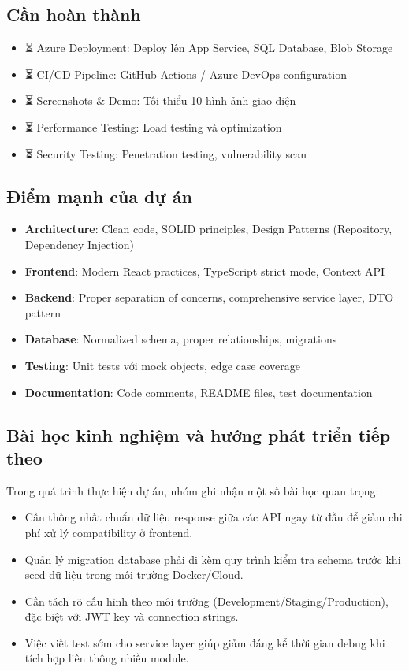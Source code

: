 \documentclass[a4paper]{article}
\begin{document}
    \subsection{Cần hoàn thành}
    \begin{itemize}
        \item ⏳ Azure Deployment: Deploy lên App Service, SQL Database, Blob Storage
        \item ⏳ CI/CD Pipeline: GitHub Actions / Azure DevOps configuration
        \item ⏳ Screenshots & Demo: Tối thiểu 10 hình ảnh giao diện
        \item ⏳ Performance Testing: Load testing và optimization
        \item ⏳ Security Testing: Penetration testing, vulnerability scan
    \end{itemize}

    \subsection{Điểm mạnh của dự án}
    \begin{itemize}
        \item \textbf{Architecture}: Clean code, SOLID principles, Design Patterns (Repository, Dependency Injection)
        \item \textbf{Frontend}: Modern React practices, TypeScript strict mode, Context API
        \item \textbf{Backend}: Proper separation of concerns, comprehensive service layer, DTO pattern
        \item \textbf{Database}: Normalized schema, proper relationships, migrations
        \item \textbf{Testing}: Unit tests với mock objects, edge case coverage
        \item \textbf{Documentation}: Code comments, README files, test documentation
    \end{itemize}

    \subsection{Bài học kinh nghiệm và hướng phát triển tiếp theo}
    Trong quá trình thực hiện dự án, nhóm ghi nhận một số bài học quan trọng:
    \begin{itemize}
        \item Cần thống nhất chuẩn dữ liệu response giữa các API ngay từ đầu để giảm chi phí xử lý compatibility ở frontend.
        \item Quản lý migration database phải đi kèm quy trình kiểm tra schema trước khi seed dữ liệu trong môi trường Docker/Cloud.
        \item Cần tách rõ cấu hình theo môi trường (Development/Staging/Production), đặc biệt với JWT key và connection strings.
        \item Việc viết test sớm cho service layer giúp giảm đáng kể thời gian debug khi tích hợp liên thông nhiều module.
    \end{itemize}
\end{document}
